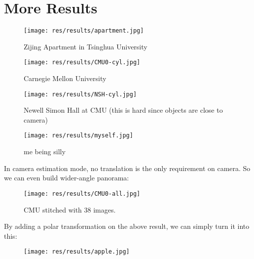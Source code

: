 
\section{More Results}
\begin{figure}[H]
  \centering
  \texttt{[image: res/results/apartment.jpg]}
  \caption{Zijing Apartment in Tsinghua University}
\end{figure}

\begin{figure}[H]
  \centering
  \texttt{[image: res/results/CMU0-cyl.jpg]}
  \caption{Carnegie Mellon University}
\end{figure}

\begin{figure}[H]
  \centering
  \texttt{[image: res/results/NSH-cyl.jpg]}
  \caption{Newell Simon Hall at CMU (this is hard since objects are close to camera)}
\end{figure}
\begin{figure}[H]
  \centering
  \texttt{[image: res/results/myself.jpg]}
  \caption{me being silly}
\end{figure}

In camera estimation mode, no translation is the only requirement on camera.
So we can even build wider-angle panorama:
\begin{figure}[H]
  \centering
  \texttt{[image: res/results/CMU0-all.jpg]}
  \caption{CMU stitched with 38 images.}
\end{figure}


\newpage
By adding a polar transformation on the above result, we can simply turn it into this:


\begin{figure}[H]
  \centering
  \texttt{[image: res/results/apple.jpg]}
\end{figure}
